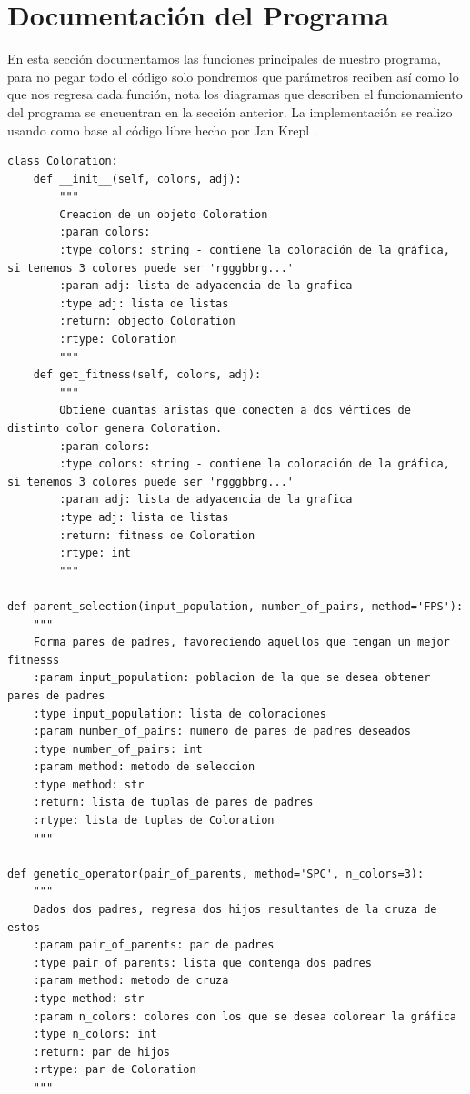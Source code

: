\documentclass{article}
\begin{document}
\section{Documentación del Programa}
En esta sección documentamos las funciones principales de nuestro programa, para no pegar todo el código solo pondremos que parámetros reciben así como lo que nos regresa cada función, nota los diagramas que describen el funcionamiento del programa se encuentran en la sección anterior. La implementación se realizo usando como base al código libre hecho por Jan Krepl \cite{Graph Colouring Repository}.
\small{ 
\begin{verbatim}
class Coloration:
    def __init__(self, colors, adj):
        """
        Creacion de un objeto Coloration
        :param colors: 
        :type colors: string - contiene la coloración de la gráfica, si tenemos 3 colores puede ser 'rgggbbrg...'
        :param adj: lista de adyacencia de la grafica 
        :type adj: lista de listas 
        :return: objecto Coloration
        :rtype: Coloration
        """
    def get_fitness(self, colors, adj):
        """
        Obtiene cuantas aristas que conecten a dos vértices de distinto color genera Coloration.
        :param colors:
        :type colors: string - contiene la coloración de la gráfica, si tenemos 3 colores puede ser 'rgggbbrg...'
        :param adj: lista de adyacencia de la grafica 
        :type adj: lista de listas
        :return: fitness de Coloration
        :rtype: int  
        """

def parent_selection(input_population, number_of_pairs, method='FPS'):
    """
    Forma pares de padres, favoreciendo aquellos que tengan un mejor fitnesss
    :param input_population: poblacion de la que se desea obtener pares de padres
    :type input_population: lista de coloraciones
    :param number_of_pairs: numero de pares de padres deseados
    :type number_of_pairs: int
    :param method: metodo de seleccion
    :type method: str
    :return: lista de tuplas de pares de padres 
    :rtype: lista de tuplas de Coloration
    """

def genetic_operator(pair_of_parents, method='SPC', n_colors=3):
    """
    Dados dos padres, regresa dos hijos resultantes de la cruza de estos
    :param pair_of_parents: par de padres 
    :type pair_of_parents: lista que contenga dos padres
    :param method: metodo de cruza 
    :type method: str
    :param n_colors: colores con los que se desea colorear la gráfica
    :type n_colors: int 
    :return: par de hijos
    :rtype: par de Coloration
    """


\end{verbatim}}
\end{document}

